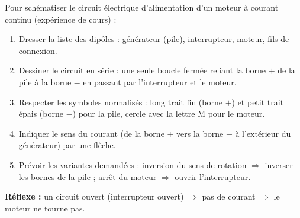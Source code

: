 \documentclass[11pt]{article}
\newcommand{\cle}[1]{{\popxbold\color{popdark}#1}}
\begin{document}
\begin{methode}
Pour schématiser le circuit électrique d'alimentation d'un moteur à courant continu (expérience de cours) :
\begin{enumerate}
\item Dresser la liste des dipôles : \cle{générateur} (pile), \cle{interrupteur}, \cle{moteur}, fils de connexion.
\item Dessiner le circuit en \cle{série} : une seule boucle fermée reliant la borne $+$ de la pile à la borne $-$ en passant par l'interrupteur et le moteur.
\item Respecter les symboles normalisés : long trait fin (borne $+$) et petit trait épais (borne $-$) pour la pile, cercle avec la lettre M pour le moteur.
\item Indiquer le sens du courant (de la borne $+$ vers la borne $-$ à l'extérieur du générateur) par une flèche.
\item Prévoir les variantes demandées : inversion du sens de rotation $\Rightarrow$ inverser les bornes de la pile ; arrêt du moteur $\Rightarrow$ ouvrir l'interrupteur.
\end{enumerate}
\textbf{Réflexe :} un circuit ouvert (interrupteur ouvert) $\Rightarrow$ pas de courant $\Rightarrow$ le moteur ne tourne pas.
\end{methode}
\end{document}
